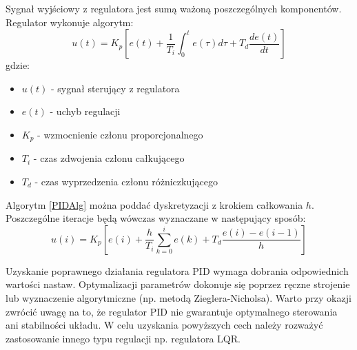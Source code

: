 \documentclass[12pt, oneside]{report}
\theoremstyle{definition}
\begin{document}
Sygnał wyjściowy z regulatora jest sumą ważoną poszczególnych komponentów. Regulator wykonuje algorytm:
\begin{equation} \label{PIDAlg}
u(t) = K_p[e(t) + \frac{1}{T_i}\int_{0}^{t} e(\tau) d\tau + T_d \frac{de(t)}{dt}]
\end{equation}
gdzie:
\begin{itemize}
\item $u(t)$ - sygnał sterujący z regulatora
\item $e(t)$ - uchyb regulacji
\item $K_p$ - wzmocnienie członu proporcjonalnego
\item $T_i$ - czas zdwojenia członu całkującego
\item $T_d$ - czas wyprzedzenia członu różniczkującego
\end{itemize}

Algorytm \ref{PIDAlg} można poddać dyskretyzacji z krokiem całkowania $h$. Poszczególne iteracje będą wówczas wyznaczane w następujący sposób:
\begin{equation}
u(i) = K_p[e(i) + \frac{h}{T_i} \sum_{k=0}^{i} e(k) + T_d \frac{e(i) - e(i-1)}{h}]
\end{equation}

Uzyskanie poprawnego działania regulatora PID wymaga dobrania odpowiednich wartości nastaw. Optymalizacji parametrów dokonuje się poprzez ręczne strojenie lub wyznaczenie algorytmiczne (np. metodą Zieglera-Nicholsa). Warto przy okazji zwrócić uwagę na to, że regulator PID nie gwarantuje optymalnego sterowania ani stabilności układu. W celu uzyskania powyższych cech należy rozważyć zastosowanie innego typu regulacji np. regulatora LQR.
\end{document}
